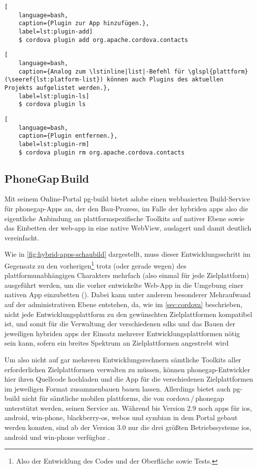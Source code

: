 {\begin{lstlisting}[
	language=bash,
	caption={Plugin zur App hinzufügen.},
	label=lst:plugin-add]
	$ cordova plugin add org.apache.cordova.contacts
\end{lstlisting}

\begin{lstlisting}[
	language=bash,
	caption={Analog zum \lstinline|list|-Befehl für \glspl{plattform} (\seeref{lst:platform-list}) können auch Plugins des aktuellen Projekts aufgelistet werden.},
	label=lst:plugin-ls]
	$ cordova plugin ls
\end{lstlisting}

\begin{lstlisting}[
	language=bash,
	caption={Plugin entfernen.},
	label=lst:plugin-rm]
	$ cordova plugin rm org.apache.cordova.contacts
\end{lstlisting}


\subsection{PhoneGap\,Build}

Mit seinem Online-Portal \gls{pg-build} bietet \gls{adobe} einen webbasierten Build-Service für \gls{phonegap}-Apps an, der den Bau-Prozess, im Falle der hybriden \glspl{app} also die eigentliche Anbindung an plattformspezifische Toolkits auf nativer Ebene sowie das Einbetten der \gls{web-app} in eine native WebView, auslagert und damit deutlich vereinfacht.

Wie in \autoref{fig:hybrid-apps-schaubild} dargestellt, muss dieser Entwicklungsschritt im Gegensatz zu den vorherigen\footnote{Also der Entwicklung des Codes und der Oberfläche sowie Tests.} trotz (oder gerade wegen) des plattformunabhängigen Charakters mehrfach (also einmal für jede Zielplattform) ausgeführt werden, um die vorher entwickelte Web-App in die Umgebung einer nativen App einzubetten ().
Dabei kann unter anderem besonderer Mehraufwand auf der administrativen Ebene entstehen, da, wie im \autoref{sec:cordova} beschrieben, nicht jede Entwicklungsplattform zu den gewünschten Zielplattformen kompatibel ist, und somit für die Verwaltung der verschiedenen \glspl{sdk} und das Bauen der jeweiligen hybriden \glspl{app} der Einsatz mehrerer Entwicklungsplattformen nötig sein kann, sofern ein breites Spektrum an Zielplattformen angestrebt wird

Um also nicht auf gar mehreren Entwicklungsrechnern sämtliche Toolkits aller erforderlichen Zielplattformen verwalten zu müssen, können \gls{phonegap}-Entwickler hier ihren Quellcode hochladen und die App für die verschiedenen Zielplattformen im jeweiligen Format zusammenbauen bauen lassen.
Allerdings bietet auch \gls{pg-build} nicht für sämtliche mobilen \glspl{plattform}, die von \gls{cordova}\,/\,\gls{phonegap} unterstützt werden, seinen Service an.
Während bis Version 2.9 noch \glspl{app} für \gls{ios}, \gls{android}, \gls{win-phone}, \gls{blackberry-os}, \gls{webos} und \gls{symbian} in dem Portal gebaut werden konnten,
sind ab der Version 3.0 nur die drei größten Betriebssysteme \gls{ios}, \gls{android} und \gls{win-phone} verfügbar \cite{PhoneGap_Build_Documentation_Supported-Platforms}. 

}
